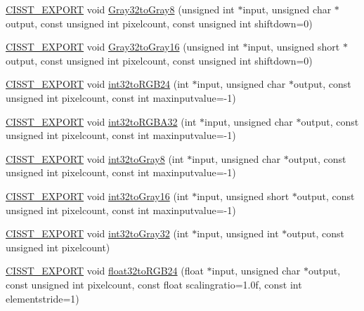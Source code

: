 \begin{DoxyCompactItemize}
\item 
\hyperlink{cmn_export_macros_8h_a99393e0c3ac434b2605235bbe20684f8}{C\+I\+S\+S\+T\+\_\+\+E\+X\+P\+O\+R\+T} void \hyperlink{namespacesvl_converter_ae99214e89a1b6e46cbe528763adcb19f}{Gray32to\+Gray8} (unsigned int $\ast$input, unsigned char $\ast$output, const unsigned int pixelcount, const unsigned int shiftdown=0)
\item 
\hyperlink{cmn_export_macros_8h_a99393e0c3ac434b2605235bbe20684f8}{C\+I\+S\+S\+T\+\_\+\+E\+X\+P\+O\+R\+T} void \hyperlink{namespacesvl_converter_a99f79c3fccd8441e34cdfad39014dad8}{Gray32to\+Gray16} (unsigned int $\ast$input, unsigned short $\ast$output, const unsigned int pixelcount, const unsigned int shiftdown=0)
\item 
\hyperlink{cmn_export_macros_8h_a99393e0c3ac434b2605235bbe20684f8}{C\+I\+S\+S\+T\+\_\+\+E\+X\+P\+O\+R\+T} void \hyperlink{namespacesvl_converter_a3211679e1d1d7be6d1557b0aa1d3d779}{int32to\+R\+G\+B24} (int $\ast$input, unsigned char $\ast$output, const unsigned int pixelcount, const int maxinputvalue=-\/1)
\item 
\hyperlink{cmn_export_macros_8h_a99393e0c3ac434b2605235bbe20684f8}{C\+I\+S\+S\+T\+\_\+\+E\+X\+P\+O\+R\+T} void \hyperlink{namespacesvl_converter_ac3ca2f47eb7716449255c4c7974d5878}{int32to\+R\+G\+B\+A32} (int $\ast$input, unsigned char $\ast$output, const unsigned int pixelcount, const int maxinputvalue=-\/1)
\item 
\hyperlink{cmn_export_macros_8h_a99393e0c3ac434b2605235bbe20684f8}{C\+I\+S\+S\+T\+\_\+\+E\+X\+P\+O\+R\+T} void \hyperlink{namespacesvl_converter_a1580d5d542d6f54bc898be8a395c0f14}{int32to\+Gray8} (int $\ast$input, unsigned char $\ast$output, const unsigned int pixelcount, const int maxinputvalue=-\/1)
\item 
\hyperlink{cmn_export_macros_8h_a99393e0c3ac434b2605235bbe20684f8}{C\+I\+S\+S\+T\+\_\+\+E\+X\+P\+O\+R\+T} void \hyperlink{namespacesvl_converter_ad912afac82a226820a273026e5670717}{int32to\+Gray16} (int $\ast$input, unsigned short $\ast$output, const unsigned int pixelcount, const int maxinputvalue=-\/1)
\item 
\hyperlink{cmn_export_macros_8h_a99393e0c3ac434b2605235bbe20684f8}{C\+I\+S\+S\+T\+\_\+\+E\+X\+P\+O\+R\+T} void \hyperlink{namespacesvl_converter_aa0d1a923946a169960afe1d3b077bd68}{int32to\+Gray32} (int $\ast$input, unsigned int $\ast$output, const unsigned int pixelcount)
\item 
\hyperlink{cmn_export_macros_8h_a99393e0c3ac434b2605235bbe20684f8}{C\+I\+S\+S\+T\+\_\+\+E\+X\+P\+O\+R\+T} void \hyperlink{namespacesvl_converter_a3e66066016ffa0ae6029f46d48ab578b}{float32to\+R\+G\+B24} (float $\ast$input, unsigned char $\ast$output, const unsigned int pixelcount, const float scalingratio=1.\+0f, const int elementstride=1)

\end{DoxyCompactItemize}
